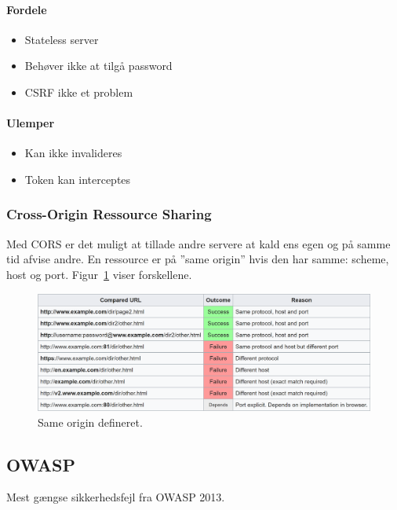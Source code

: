 \begin{multicols}{2}
	\paragraph{Fordele}

	\begin{itemize}
		\item Stateless server
		\item Behøver ikke at tilgå password
		\item CSRF ikke et problem
	\end{itemize}

	\paragraph{Ulemper}
	
	\begin{itemize}
		\item Kan ikke invalideres
		\item Token kan interceptes
	\end{itemize}
\end{multicols}

\subsubsection{Cross-Origin Ressource Sharing}
Med CORS er det muligt at tillade andre servere at kald ens egen og på samme tid afvise andre. En ressource er på ''same origin'' hvis den har samme: scheme, host og port. Figur~\ref{fig:cors-same-origin} viser forskellene.

\begin{figure}[h]
	\centering
	\includegraphics[width=\linewidth]{figs/spm6/cors-same-origin}
	\caption{Same origin defineret.}
	\label{fig:cors-same-origin}
\end{figure}

\subsection{OWASP}
Mest gængse sikkerhedsfejl fra OWASP 2013.

